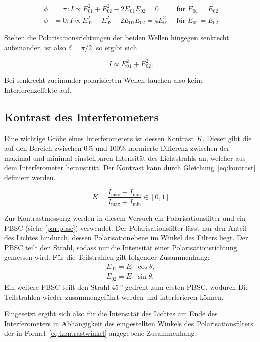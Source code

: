 \begin{align}
\phi &= \pi : I\propto E_{01}^2 + E_{02}^2 - 2E_{01}E_{02}
= 0 &\text{ für } E_{01}=E_{02}\\
\phi &= 0 : I\propto E_{01}^2 + E_{02}^2 + 2E_{01}E_{02}
= 4E_{01}^2 &\text{ für } E_{01}=E_{02}
\end{align}

Stehen die Polarisationsrichtungen der beiden Wellen hingegen senkrecht aufeinander, ist also $\delta = \pi/2$, so ergibt sich

\begin{equation}
I \propto E_{01}^2 + E_{02}^2.
\end{equation}

Bei senkrecht zueinander polarisierten Wellen tauchen also keine Interferenzeffekte auf.


\subsection{Kontrast des Interferometers}
Eine wichtige Größe eines Interferometers ist dessen Kontrast $K$. Dieser gibt die auf den Bereich zwischen 0\% und 100\% normierte Differenz zwischen der maximal und minimal einstellbaren Intensität des Lichtstrahls an, welcher aus dem Interferometer heraustritt. Der Kontrast kann durch Gleichung~\eqref{eq:kontrast} definiert werden.

\begin{equation}
K = \frac{I_\text{max}-I_\text{min}}{I_\text{max}+I_\text{min}} \in [0,1]
\label{eq:kontrast}
\end{equation}

Zur Kontrastmessung werden in diesem Versuch ein Polarisationsfilter und ein PBSC (siehe \ref{par:pbsc}) verwendet. Der Polarisationsfilter lässt nur den Anteil des Lichtes hindurch, dessen Polarisationebene im Winkel des Filters liegt.
Der PBSC teilt den Strahl, sodass nur die Intensität einer Polarisationsrichtung gemessen wird.
Für die Teilstrahlen gilt folgender Zusammenhang:
\begin{align*}
E_{01}=E\cdot\cos \theta,\\
E_{02}=E\cdot\sin \theta.
\end{align*}
Ein weitere PBSC teilt den Strahl $\SI{45}{°}$ gedreht zum ersten PBSC, wodurch Die Teilstrahlen wieder zusammengeführt werden und interferieren können.

Eingesetzt ergibt sich also für die Intensität des Lichtes am Ende des Interferometers in Abhängigkeit des
eingestellten Winkels des Polarisationsfilters der in Formel~\eqref{eq:kontrastwinkel} angegebene Zusammenhang.

